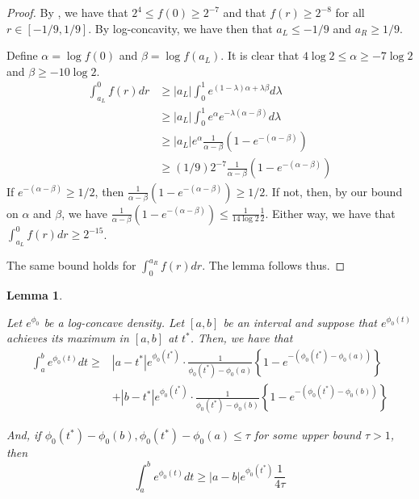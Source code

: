 \documentclass[12pt]{article}
\newtheorem{lemma}[theorem]{Lemma}
\begin{document}
\begin{proof}

  By \citet[][Theorem~5.14(d)]{lovasz2007geometry}, we have that $2^4 \leq f(0) \geq 2^{-7}$ and that $f(r) \geq 2^{-8}$ for all $r \in [-1/9, 1/9]$. By log-concavity, we have then that $a_L \leq -1/9$ and $a_R \geq 1/9$.

  Define $\alpha = \log f(0)$ and $\beta = \log f(a_L)$. It is clear that $4 \log 2 \leq \alpha \geq -7 \log 2$ and $ \beta \geq -10 \log 2$.
  \begin{align*}
    \int_{a_L}^0 f(r) dr & \geq |a_L| \int_0^1 e^{(1-\lambda) \alpha + \lambda \beta} d \lambda \\
                         & \geq |a_L| \int_0^1 e^\alpha e^{- \lambda(\alpha - \beta)} d\lambda \\
                         &\geq |a_L| e^{\alpha} \frac{1}{\alpha - \beta} ( 1 - e^{-(\alpha - \beta)}) \\
                         &\geq (1/9) 2^{-7} \frac{1}{\alpha - \beta} ( 1 - e^{-(\alpha - \beta)})
  \end{align*}
  If $e^{-(\alpha - \beta)} \geq 1/2$, then $ \frac{1}{\alpha - \beta} ( 1 - e^{-(\alpha - \beta)}) \geq 1/2$. If not, then, by our bound on $\alpha$ and $\beta$, we have $ \frac{1}{\alpha - \beta} ( 1 - e^{-(\alpha - \beta)}) \leq \frac{1}{14 \log 2} \frac{1}{2}$. Either way, we have that
  $\int_{a_L}^0 f(r) dr \geq 2^{-15}$.

  
  The same bound holds for $\int_0^{a_R} f(r) dr$. The lemma follows thus.
  
\end{proof}

\begin{lemma}
  \label{lem:integral_approximation}

  Let $e^{\phi_0}$ be a log-concave density. Let $[a,b]$ be an interval and suppose that $e^{\phi_0(t)}$ achieves its maximum in $[a,b]$ at $t^*$. Then, we have that
  \begin{align*}
    \int_a^b e^{\phi_0(t)}dt \geq &|a - t^*| e^{\phi_0(t^*)} \cdot \frac{1}{\phi_0(t^*) - \phi_0(a)} \left\{ 1 - e^{-(\phi_0(t^*) - \phi_0(a))} \right\} \\
    &+ |b - t^*| e^{\phi_0(t^*)} \cdot \frac{1}{\phi_0(t^*) - \phi_0(b)} \left\{ 1 - e^{-(\phi_0(t^*) - \phi_0(b))} \right\}
  \end{align*}

  And, if $\phi_0(t^*) - \phi_0(b), \phi_0(t^*) - \phi_0(a) \leq \tau$ for some upper bound $\tau > 1$, then
  \[
  \int_a^b e^{\phi_0(t)}dt \geq |a - b| e^{\phi_0(t^*)} \frac{1}{4 \tau}
  \]
  
\end{lemma}
\end{document}
